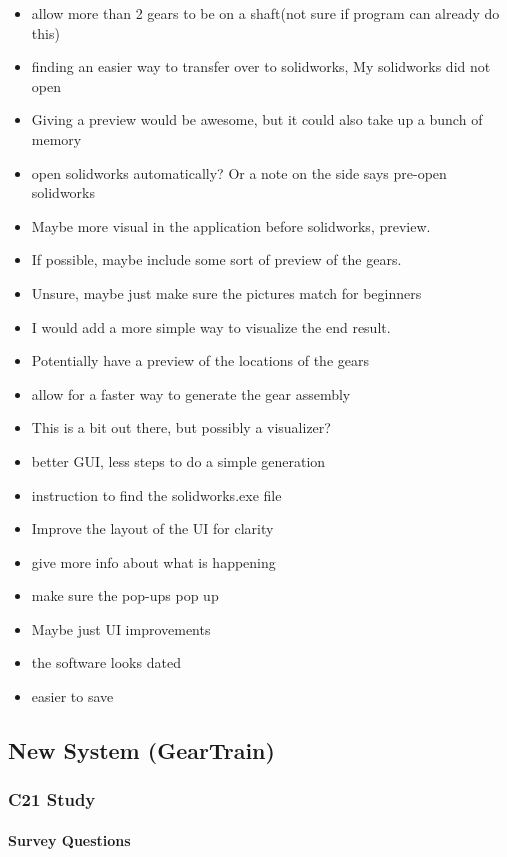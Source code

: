 \begin{itemize}
    \item allow more than 2 gears to be on a shaft(not sure if program can already do this)
    \item finding an easier way to transfer over to solidworks, My solidworks did not open
    \item Giving a preview would be awesome, but it could also take up a bunch of memory
    \item open solidworks automatically? Or a note on the side says pre-open solidworks
    \item Maybe more visual in the application before solidworks, preview.
    \item If possible, maybe include some sort of preview of the gears.
    \item Unsure, maybe just make sure the pictures match for beginners
    \item I would add a more simple way to visualize the end result.
    \item Potentially have a preview of the locations of the gears
    \item allow for a faster way to generate the gear assembly
    \item This is a bit out there, but possibly a visualizer?
    \item better GUI, less steps to do a simple generation
    \item instruction to find the solidworks.exe file
    \item Improve the layout of the UI for clarity
    \item give more info about what is happening
    \item make sure the pop-ups pop up
    \item Maybe just UI improvements
    \item the software looks dated
    \item easier to save
\end{itemize}

\subsection{New System (GearTrain)}

\subsubsection{C21 Study}
\paragraph{Survey Questions}
\label{app:survey_c21_ques}

